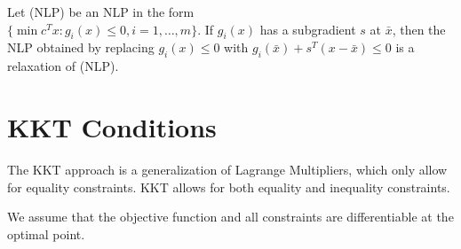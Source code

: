 \documentclass[a4paper]{report}
\begin{document}
	\begin{corollary}
		\label{nlp} Let (NLP) be an NLP in the form \\$\{\min c^{T}x : g_{i}(x) \leq
		0, i = 1, \dots, m\}$. If $g_{i}(x)$ has a subgradient $s$ at $\bar x$, then
		the NLP obtained by replacing $g_{i}(x) \leq 0$ with
		$g_{i}(\bar x) + s^{T}(x - \bar x)\leq 0$ is a relaxation of (NLP).
	\end{corollary}

	\newpage

	\section{KKT Conditions}
	The KKT approach is a generalization of Lagrange Multipliers, which only allow
	for equality constraints. KKT allows for both equality and inequality constraints.
	\begin{note}
		We assume that the objective function and all constraints are differentiable
		at the optimal point.
	\end{note}
\end{document}
